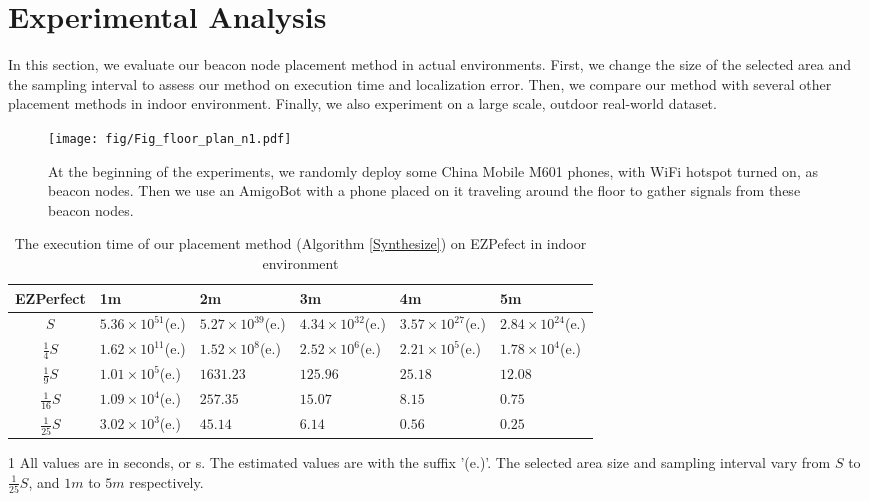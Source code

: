 \documentclass[10pt, conference, letterpaper]{IEEEtran}
\begin{document}
\section{Experimental Analysis} \label{Evaluation}
In this section, we evaluate our beacon node placement method in actual environments. First, we change the size of the selected area and the sampling interval to assess our method on execution time and localization error. Then, we compare our method with several other placement methods in indoor environment. Finally, we also experiment on a large scale, outdoor real-world dataset.

\begin{figure*}
\centering
\texttt{[image: fig/Fig\_floor\_plan\_n1.pdf]}\\
\caption{\textrm{At the beginning of the experiments, we randomly deploy some China Mobile M601 phones, with WiFi hotspot turned on, as beacon nodes. Then we use an AmigoBot with a phone placed on it traveling around the floor to gather signals from these beacon nodes.}} \label{fig6}
\end{figure*}

\begin{table}[!t]
\renewcommand{\arraystretch}{1.0}
\caption{The execution time of our placement method (Algorithm \ref{Synthesize}) on EZPefect in indoor environment} \label{experiment_time_EZPefect}
\centering
\begin{threeparttable}
\begin{tabular}{|c|p{0.9cm}|p{0.9cm}|p{0.9cm}|p{0.9cm}|p{0.9cm}|}
  \hline
EZPerfect  & 1m & 2m & 3m & 4m & 5m \\
  \hline
  $S$ & $5.36 \times 10^{51}$(e.) & $5.27 \times 10^{39}$(e.) & $4.34 \times 10^{32}$(e.) & $3.57 \times 10^{27}$(e.) & $2.84 \times 10^{24}$(e.)  \\
  \hline
  $\frac{1}{4}S$ & $1.62 \times 10^{11}$(e.) & $1.52 \times 10^{8}$(e.) & $2.52 \times 10^{6}$(e.) & $2.21 \times 10^{5}$(e.) & $1.78 \times 10^{4}$(e.) \\
  \hline
  $\frac{1}{9}S$ & $1.01 \times 10^{5}$(e.) & $1631.23$ & $125.96$ & $25.18$ & $12.08$ \\
  \hline
  $\frac{1}{16}S$ & $1.09 \times 10^{4}$(e.) & $257.35$ & $15.07$ & $8.15$ & $0.75$ \\
  \hline
  $\frac{1}{25}S$ & $3.02 \times 10^{3}$(e.) & $45.14$ & $6.14$ & $0.56$ & $0.25$ \\
  \hline
\end{tabular}
\begin{tablenotes}
    \footnotesize
    \item[1] All values are in seconds, or s. The estimated values are with the suffix '(e.)'. The selected area size and sampling interval vary from $S$ to $\frac{1}{25}S$, and $1m$ to $5m$ respectively.
\end{tablenotes}
\end{threeparttable}
\end{table}
\end{document}
